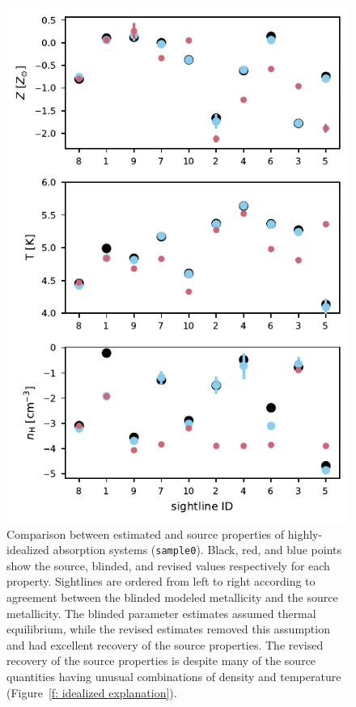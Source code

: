 \documentclass[fleqn,usenatbib]{mnras}
\begin{document}
\begin{figure}
    \centering
    \includegraphics[width=\columnwidth]{figures/sample0/comparison.pdf}
    \caption{
    Comparison between estimated and source properties of highly-idealized absorption systems (\texttt{sample0}).
        Black, red, and blue points show the source, blinded, and revised values respectively for each property.
    Sightlines are ordered from left to right according to agreement between the blinded modeled metallicity and the source metallicity.
   The blinded parameter estimates assumed thermal equilibrium,
   while the revised estimates removed this assumption and had excellent recovery of the source properties.
   The revised recovery of the source properties is despite many of the source quantities having unusual combinations of density and temperature (Figure~\ref{f: idealized explanation}).
    }
    \label{f: idealized}
\end{figure}
\end{document}
